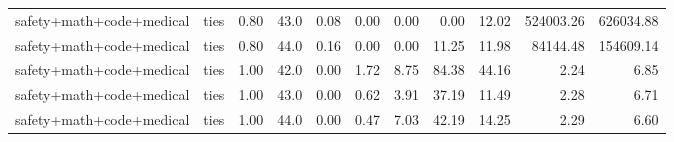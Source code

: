 \begin{table}[H]
{\begin{tabular}{llllrrrrrrr}
safety+math+code+medical & ties & 0.80 & 43.0 & 0.08 & 0.00 & 0.00 & 0.00 & 12.02 & 524003.26 & 626034.88 \\
safety+math+code+medical & ties & 0.80 & 44.0 & 0.16 & 0.00 & 0.00 & 11.25 & 11.98 & 84144.48 & 154609.14 \\
safety+math+code+medical & ties & 1.00 & 42.0 & 0.00 & 1.72 & 8.75 & 84.38 & 44.16 & 2.24 & 6.85 \\
safety+math+code+medical & ties & 1.00 & 43.0 & 0.00 & 0.62 & 3.91 & 37.19 & 11.49 & 2.28 & 6.71 \\
safety+math+code+medical & ties & 1.00 & 44.0 & 0.00 & 0.47 & 7.03 & 42.19 & 14.25 & 2.29 & 6.60 \\
\bottomrule
\end{tabular}
}
\end{table}